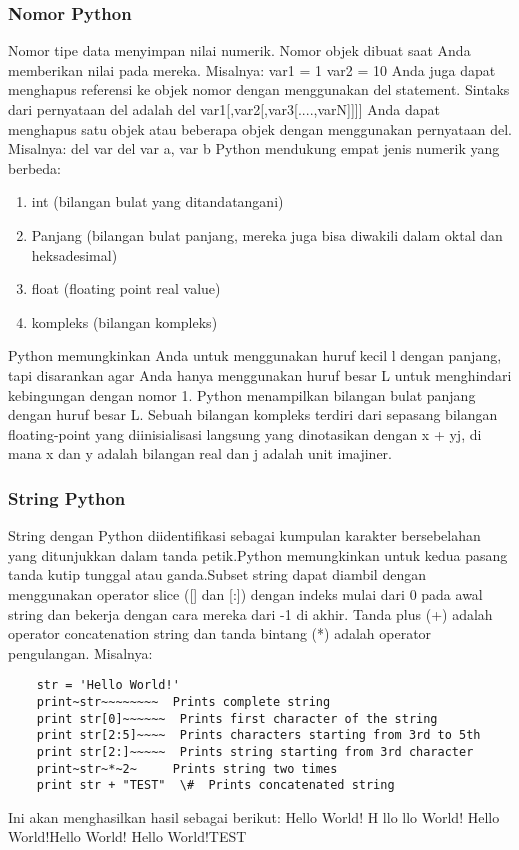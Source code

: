 \subsubsection{Nomor Python}
Nomor tipe data menyimpan nilai numerik. Nomor objek dibuat saat Anda memberikan nilai pada mereka. 
Misalnya: 
	var1 = 1 
	var2 = 10 
Anda juga dapat menghapus referensi ke objek nomor dengan menggunakan del statement. Sintaks dari pernyataan del adalah 
del var1[,var2[,var3[....,varN]]]] 
Anda dapat menghapus satu objek atau beberapa objek dengan menggunakan pernyataan del. 
Misalnya:
	del var 
	del var a, var b 
Python mendukung empat jenis numerik yang berbeda:
\begin{enumerate}
	\item int (bilangan bulat yang ditandatangani) 
	\item Panjang (bilangan bulat panjang, mereka juga bisa diwakili dalam oktal dan heksadesimal) 
	\item float (floating point real value)
	\item kompleks (bilangan kompleks) 
\end{enumerate}
Python memungkinkan Anda untuk menggunakan huruf kecil l dengan panjang, tapi disarankan agar Anda hanya menggunakan huruf besar L untuk menghindari kebingungan dengan nomor 1.  
Python menampilkan bilangan bulat panjang dengan huruf besar L.
Sebuah bilangan kompleks terdiri dari sepasang bilangan floating-point yang diinisialisasi langsung yang dinotasikan dengan x + yj, di mana x dan y adalah bilangan real dan j adalah unit imajiner. 

\subsubsection{String Python}
String dengan Python diidentifikasi sebagai kumpulan karakter bersebelahan yang ditunjukkan dalam tanda petik.Python memungkinkan untuk kedua pasang tanda kutip tunggal atau ganda.Subset string dapat diambil dengan menggunakan operator slice ([] dan [:]) dengan indeks mulai dari 0 pada awal string dan bekerja dengan cara mereka dari -1 di akhir. 
Tanda plus (+) adalah operator concatenation string dan tanda bintang (*) adalah operator pengulangan.
Misalnya:
\begin{verbatim}
	str = 'Hello World!' 
	print~str~~~~~~~~  Prints complete string 
	print str[0]~~~~~~  Prints first character of the string 
	print str[2:5]~~~~  Prints characters starting from 3rd to 5th
	print str[2:]~~~~~  Prints string starting from 3rd character 
	print~str~*~2~     Prints string two times 
	print str + "TEST"  \#  Prints concatenated string 
\end{verbatim}
Ini akan menghasilkan hasil sebagai berikut:
	Hello World! 
	H  
	llo 
	llo World!
	Hello World!Hello World! 
	Hello World!TEST

